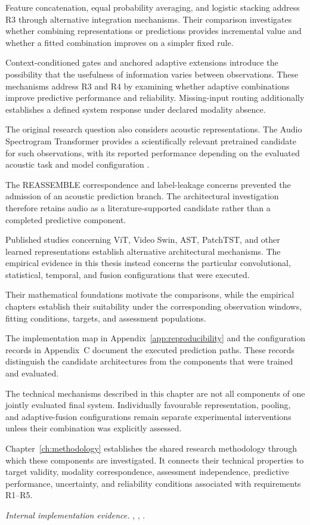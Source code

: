 Feature concatenation, equal probability averaging, and logistic stacking address R3 through alternative integration mechanisms. Their comparison investigates whether combining representations or predictions provides incremental value and whether a fitted combination improves on a simpler fixed rule.

Context-conditioned gates and anchored adaptive extensions introduce the possibility that the usefulness of information varies between observations. These mechanisms address R3 and R4 by examining whether adaptive combinations improve predictive performance and reliability. Missing-input routing additionally establishes a defined system response under declared modality absence.

The original research question also considers acoustic representations. The Audio Spectrogram Transformer provides a scientifically relevant pretrained candidate for such observations, with its reported performance depending on the evaluated acoustic task and model configuration \parencite{P011}.

The REASSEMBLE correspondence and label-leakage concerns prevented the admission of an acoustic prediction branch. The architectural investigation therefore retains audio as a literature-supported candidate rather than a completed predictive component.

Published studies concerning ViT, Video Swin, AST, PatchTST, and other learned representations establish alternative architectural mechanisms. The empirical evidence in this thesis instead concerns the particular convolutional, statistical, temporal, and fusion configurations that were executed.

Their mathematical foundations motivate the comparisons, while the empirical chapters establish their suitability under the corresponding observation windows, fitting conditions, targets, and assessment populations.

The implementation map in Appendix~\ref{app:reproducibility} and the configuration records in Appendix~C document the executed prediction paths. These records distinguish the candidate architectures from the components that were trained and evaluated.

The technical mechanisms described in this chapter are not all components of one jointly evaluated final system. Individually favourable representation, pooling, and adaptive-fusion configurations remain separate experimental interventions unless their combination was explicitly assessed.

Chapter~\ref{ch:methodology} establishes the shared research methodology through which these components are investigated. It connects their technical properties to target validity, modality correspondence, assessment independence, predictive performance, uncertainty, and reliability conditions associated with requirements R1–R5.

\noindent\textit{Internal implementation evidence.} , , .
